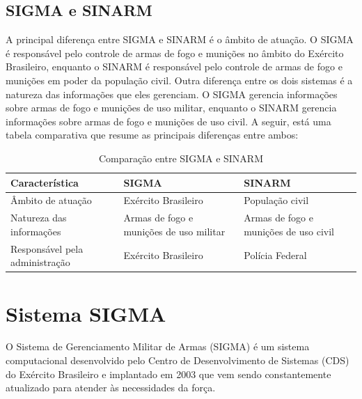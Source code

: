 \subsection{SIGMA e SINARM}\label{sigmaesinarm}
A principal diferença entre SIGMA e SINARM é o âmbito de atuação. O SIGMA é responsável pelo controle de armas de fogo e munições no âmbito do Exército Brasileiro, enquanto o SINARM é responsável pelo controle de armas de fogo e munições em poder da população civil.
Outra diferença entre os dois sistemas é a natureza das informações que eles gerenciam. O SIGMA gerencia informações sobre armas de fogo e munições de uso militar, enquanto o SINARM gerencia informações sobre armas de fogo e munições de uso civil.
A seguir, está uma tabela comparativa que resume as principais diferenças entre ambos: 
\begin{table}[ht]
	\centering
	\caption{Comparação entre SIGMA e SINARM}
	\begin{tabularx}{\textwidth}{lXp{5cm}}
	  \toprule
	  Característica & SIGMA & SINARM \\
	  \midrule
	  Âmbito de atuação & Exército Brasileiro & População civil \\
	  Natureza das informações & Armas de fogo e munições de uso militar & Armas de fogo e munições de uso civil \\
	  Responsável pela administração & Exército Brasileiro & Polícia Federal \\
	  \bottomrule
	\end{tabularx}
  \end{table}

  

\section{ Sistema SIGMA } 
O Sistema de Gerenciamento Militar de Armas (SIGMA) é um sistema computacional desenvolvido pelo Centro de Desenvolvimento de Sistemas (CDS) do Exército Brasileiro e  implantado em 2003 que vem sendo constantemente atualizado para atender às necessidades da força\cite{fenemeReunixE3oSobre}.

